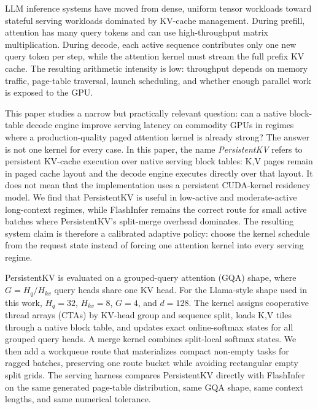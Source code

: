\documentclass[10pt]{article}
\begin{document}
LLM inference systems have moved from dense, uniform tensor workloads toward
stateful serving workloads dominated by KV-cache management. During prefill,
attention has many query tokens and can use high-throughput matrix
multiplication. During decode, each active sequence contributes only one new
query token per step, while the attention kernel must stream the full prefix
KV cache. The resulting arithmetic intensity is low: throughput depends on
memory traffic, page-table traversal, launch scheduling, and whether enough
parallel work is exposed to the GPU.

This paper studies a narrow but practically relevant question: can a native
block-table decode engine improve serving latency on commodity GPUs in regimes
where a production-quality paged attention kernel is already strong? The
answer is not one kernel for every case. In this paper, the name
\emph{PersistentKV} refers to persistent KV-cache execution over native serving
block tables: K,V pages remain in paged cache layout and the decode engine
executes directly over that layout. It does not mean that the implementation
uses a persistent CUDA-kernel residency model. We find that PersistentKV is useful in
low-active and moderate-active long-context regimes, while FlashInfer remains
the correct route for small active batches where PersistentKV's split-merge
overhead dominates. The resulting system claim is therefore a calibrated
adaptive policy:
choose the kernel schedule from the request state instead of forcing one
attention kernel into every serving regime.

PersistentKV is evaluated on a grouped-query attention (GQA) shape, where
$G=H_q/H_{kv}$ query heads share one KV head. For the Llama-style shape used in this work,
$H_q=32$, $H_{kv}=8$, $G=4$, and $d=128$. The kernel assigns cooperative thread
arrays (CTAs) by KV-head group and sequence split, loads K,V tiles through a
native block table, and updates exact online-softmax states for all grouped
query heads. A merge kernel combines split-local softmax states. We then add a
workqueue route that materializes compact non-empty tasks for ragged batches,
preserving one route bucket while avoiding rectangular empty split grids. The
serving harness compares PersistentKV directly with FlashInfer on the same
generated page-table distribution, same GQA shape, same context lengths, and same numerical
tolerance.
\end{document}
